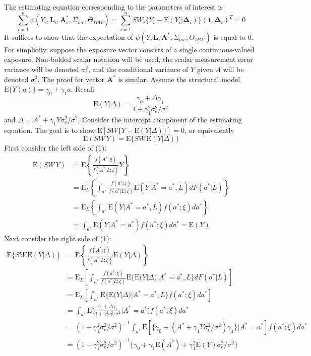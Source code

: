 \documentclass[12pt]{article}
\begin{document}
The estimating equation corresponding to the parameters of interest is
\begin{equation*}
\sum_{i=1}^{n} \psi(Y_{i}, \bm{L}_{i}, \bm{A}^{*}_{i}, \Sigma_{me}, \Theta_{IPW}) = \sum_{i=1}^{n} SW_{i}\{ Y_{i} - \text{E}(Y_{i} | \bm{\Delta}_{i}) \}(1, \bm{\Delta}_{i})^{T} = 0
\end{equation*}
It suffices to show that the expectation of $\psi(Y, \bm{L}, \bm{A}^{*}, \Sigma_{me}, \Theta_{IPW})$ is equal to 0. For simplicity, suppose the exposure vector consists of a single continuous-valued exposure. Non-bolded scalar notation will be used, the scalar measurement error variance will be denoted $\sigma_e^2$, and the conditional variance of $Y$ given $A$ will be denoted $\sigma^{2}$. The proof for vector $\bm{A}^{*}$ is similar. Assume the structural model $\text{E}\{ Y(a)\} = \gamma_0 + \gamma_1 a$. Recall
$$
\text{E}(Y | \Delta) = \frac{\gamma_{0} + \Delta \gamma_{1}}{1 + \gamma_{1}^2 \sigma_{e}^2  / \sigma^{2}}
$$
and $\Delta = A^* + \gamma_1 Y \sigma_e^2 / \sigma^2$. Consider the intercept component of the estimating equation. The goal is to show $\text{E} [SW \{Y - \text{E}(Y|\Delta) \} ]= 0$, or equivalently
\begin{equation}
\text{E}( SW \, Y )= \text{E}\{ SW \, \text{E}(Y|\Delta) \}
\end{equation}
First consider the left side of (1):
\begin{align*}
\text{E}( SW \, Y ) &= \text{E} \left \{ \frac{f(A^*;\xi)}{f(A^*|L;\zeta)} Y \right \} \\
& = \text{E}_L \left \{ \int_{a^*} \frac{f(a^*;\xi)}{f(a^*|L;\zeta)} \text{E}(Y|A^*=a^*,L) dF(a^*|L) \right \} \\
& = \text{E}_L \left \{ \int_{a^*}  \text{E}(Y|A^*=a^*,L) f(a^*;\xi) da^* \right \} \\
& = \int_{a^*}  \text{E}(Y|A^*=a^*) f(a^*;\xi) da^* = \text{E}(Y)
\end{align*}
Next consider the right side of (1):
\begin{align*}
\text{E} \{ SW \, \text{E}(Y|\Delta) \} &= \text{E} \left \{ \frac{f(A^*;\xi)}{f(A^*|L;\zeta)} \text{E}(Y|\Delta) \right \} \\
&= \text{E}_L \left [ \int_{a^*} \frac{f(a^*;\xi)}{f(a^*|L;\zeta)} \text{E}\{\text{E}(Y|\Delta)|A^*=a^*,L\} dF(a^*|L) \right ]\\
&= \text{E}_L \left [ \int_{a^*}  \text{E}\{\text{E}(Y|\Delta)|A^*=a^*,L\} f(a^*;\xi) da^* \right ]\\
&= \int_{a^*}  \text{E} \bigg(
\frac{\gamma_{0} + \Delta \gamma_{1}}{1 + \gamma_{1}^2 \sigma_{e}^2  / \sigma^{2}}
|A^*=a^* \bigg) f(a^*;\xi) da^*\\
&= (1 + \gamma_{1}^2 \sigma_{e}^2  / \sigma^{2})^{-1} \int_{a^*}  \text{E}[
\{ \gamma_{0} + (A^* + \gamma_1 Y \sigma_e^2 / \sigma^2) \gamma_{1}\}
|A^*=a^* ] f(a^*;\xi) da^*\\
&=
(1 + \gamma_{1}^2 \sigma_{e}^2  / \sigma^{2})^{-1}\{ \gamma_0 + \gamma_1 \text{E}(A^*) + \gamma_1^2
\text{E}(Y) \sigma_e^2 / \sigma^2\}
\end{align*}
\end{document}
